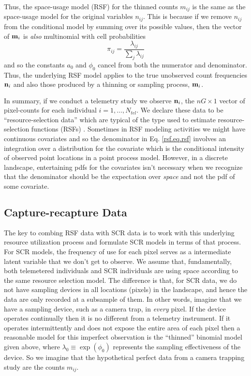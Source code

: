 \documentclass[12pt]{article}
\begin{document}
{\flushleft Thus}, the space-usage model (RSF) for the
thinned counts $m_{ij}$ is the same as the space-usage model for the
original variables $n_{ij}$.  This is because if we remove $n_{ij}$
from the conditional
 model by summing over its possible values, then the vector of
${\bf m}_{i}$ is {\it also}  multinomial with cell probabilities
\[
\pi_{ij} = \frac{\lambda_{ij}}{\sum_{j}  \lambda_{ij}}
\]
and so the constants $a_{0}$ and $\phi_{0}$
cancel from both the numerator and
denominator. Thus, the underlying RSF model applies to the true
unobserved count frequencies ${\bf n}_{i}$ and also those produced
by a thinning or sampling process, 
 ${\bf m}_{i}$.

In summary, if we conduct a telemetry study we observe ${\bf n}_{i}$,
the $nG \times 1$ vector of pixel-counts for each individual
$i=1,\ldots,N_{tel}$.  We declare these data to be
``resource-selection data'' which are typical of the type used to
estimate resource-selection functions (RSFs) \citep{manly_etal:2002}.
Sometimes in RSF modeling activities we might have
continuous covariates and so the denominator in Eq. \ref{rsf.eq.rsf}
involves an integration over a distribution for the covariate which is
the conditional intensity of observed point locations in a point
process model. However, in a discrete landscape, entertaining pdfs for
the covariates isn't necessary \citep{royle_etal:2012mee} when we
recognize that the denominator should be the expectation over {\it
  space} and not the pdf of some covariate.


\subsection{Capture-recapture Data}


The key to combing RSF data with SCR data is to work with this
underlying resource utilization process and formulate SCR models in
terms of that process. For SCR models, the frequency of use for each pixel
serves as a intermediate
latent variable that we don't get to observe. We assume that, fundamentally,
both telemetered individuals and SCR individuals are using space
according to the same resource selection model. The difference is that,
for SCR data, we
do not have sampling devices in all locations (pixels) in the landscape, and hence the
data are only recorded at a subsample of them.
In other words, imagine that we have a sampling device, such as a
camera trap, in {\it every} pixel. If the device operates continually
then it is no different from a telemetry instrument.
If it
operates  intermittently and does not expose the entire area of
each pixel then a reasonable model for this imperfect observation is
the ``thinned'' binomial model given above, where $\lambda_{0} \equiv \exp(\phi_{0})$
represents the sampling effectiveness of the device. So we imagine
that the hypothetical perfect data from a camera trapping study are
the counts $m_{ij}$.
\end{document}
